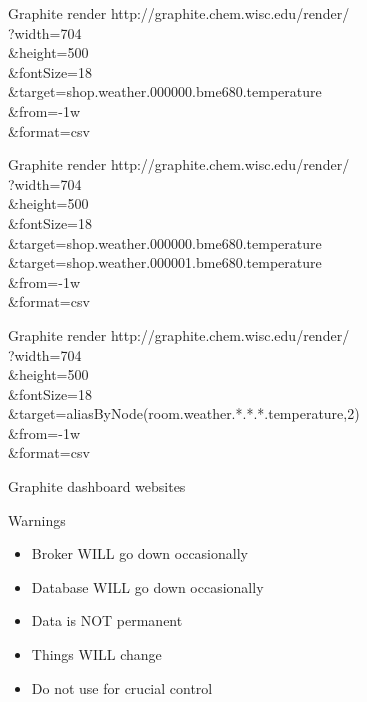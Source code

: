 \documentclass{presentation}
\begin{document}
\begin{frame}{Graphite}
  render
  \vfill
  http://graphite.chem.wisc.edu/render/ \\
	?width=704 \\
	\&height=500 \\
	\&fontSize=18 \\
	\&target=shop.weather.000000.bme680.temperature \\
	\&from=-1w \\
  \vfill
  \&format=csv  
\end{frame}

\begin{frame}{Graphite}
  render
  \vfill
  http://graphite.chem.wisc.edu/render/ \\
	?width=704 \\
	\&height=500 \\
	\&fontSize=18 \\
	\&target=shop.weather.000000.bme680.temperature \\
	\&target=shop.weather.000001.bme680.temperature \\
	\&from=-1w \\
  \vfill
  \&format=csv  
\end{frame}

\begin{frame}{Graphite}
  render
  \vfill
  http://graphite.chem.wisc.edu/render/ \\
	?width=704 \\
	\&height=500 \\
	\&fontSize=18 \\
	\&target=aliasByNode(room.weather.*.*.*.temperature,2) \\
	\&from=-1w \\
  \vfill
  \&format=csv  
\end{frame}

\begin{frame}{Graphite}
  dashboard websites
\end{frame}

\begin{frame}{Warnings}
  \begin{itemize}
    \item Broker WILL go down occasionally
    \item Database WILL go down occasionally
    \item  Data is NOT permanent
    \item Things WILL change
    \item Do not use for crucial control
  \end{itemize}
\end{frame}
\end{document}
